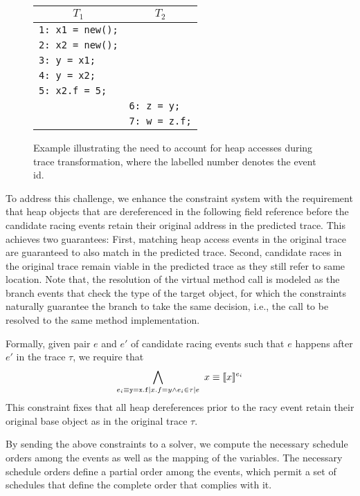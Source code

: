 \begin{figure}
	\centering
	\begin{tabular}{ll}
		\hline
		\multicolumn{1}{c}{$T_1$} & \multicolumn{1}{c}{$T_2$} \\
		\hline
		{\tt 1: x1 = new();} & \\
		{\tt 2: x2 = new();} & \\
		{\tt 3: y = x1;} & \\
		{\tt 4: y = x2;} & \\
		{\tt 5: x2.f = 5;} & \\	
		& {\tt 6: z = y;} \\
		& {\tt 7: w = z.f;} \\
	\end{tabular}
	\caption{\label{fig:heapAccess}Example illustrating the need to account for heap accesses during trace transformation, where the labelled number denotes the event id.}
\end{figure}

To address this challenge, we enhance the constraint system with the requirement that heap objects that are dereferenced in the following field reference before the candidate racing events retain their original address in the predicted trace.
This achieves two guarantees: First, matching heap access events in the original trace are guaranteed to also match in the predicted trace. Second, candidate races in the original trace remain viable in the predicted trace as they still refer to same location. Note that, the resolution of the virtual method call is modeled as the branch events that check the type of the target object, for which the constraints naturally guarantee the branch to take the same decision, i.e., the call to be resolved to the same method implementation.


Formally, given pair $e$ and $e'$ of candidate racing events such that $e$ happens after $e'$ in the trace $\tau$, 
we require that
$$
\bigwedge_{ e_i \equiv {\tt y=x.f}|x.f=y \wedge e_i \in \tau|e }\
	x \equiv  \lbrack\!\lbrack x \rbrack\!\rbrack^{e_i}
$$
This constraint fixes that all heap dereferences  prior to the racy event retain their original base object as in the original trace $\tau$. 


By sending the above constraints to a solver, we compute the necessary schedule orders among the events as well as the mapping of the variables. The necessary schedule orders define a partial order among the events, which permit a set of schedules that define the complete order that complies with it.


